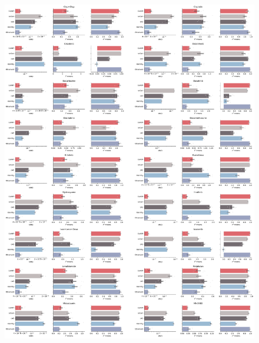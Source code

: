 \begin{figure}[H]
    \centering
    \includegraphics[width=\textwidth]{figures/cellot-methods/Bunne_Supp_Fig5_p1.pdf}
\end{figure}
